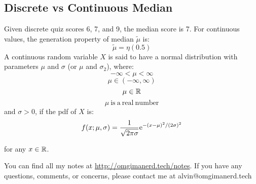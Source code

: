\documentclass{math}
\begin{document}
\subsection*{Discrete vs Continuous Median}
Given discrete quiz scores 6, 7, and 9, the median score is 7. For continuous
values, the generation property of median \( \tilde{\mu} \) is:
\[ \tilde{\mu} = \eta(0.5) \]
A continuous random variable \( X \) is said to have a normal distribution
with parameters \( \mu \) and \( \sigma \) (or \( \mu \) and \( \sigma_{2} \)),
where:
\[ -\infty < \mu < \infty \]
\[ \mu\in(-\infty,\infty) \]
\[ \mu\in\mathbb{R} \]
\[ \mu\ \mathrm{is\ a\ real\ number} \]
and \( \sigma > 0 \), if the pdf of \( X \) is:
\[ f(x;\mu,\sigma) =
   \frac{1}{\sqrt{2\pi\sigma}}\mathrm{e}^{-(x-\mu)^{2}/(2\sigma)^{2}} \]
\begin{center}
  for any \( x\in\mathbb{R} \).
\end{center}

\begin{center}
  You can find all my notes at \url{http://omgimanerd.tech/notes}. If you have
  any questions, comments, or concerns, please contact me at
  alvin@omgimanerd.tech
\end{center}
\end{document}
